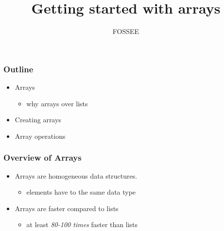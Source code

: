 \documentclass[presentation]{beamer}
\title{Getting started with arrays}
\author{FOSSEE}
\date{}
\begin{document}
\maketitle









\begin{frame}
\frametitle{Outline}
\label{sec-1}

\begin{itemize}
\item Arrays

\begin{itemize}
\item why arrays over lists
\end{itemize}

\item Creating arrays
\item Array operations
\end{itemize}
\end{frame}
\begin{frame}
\frametitle{Overview of Arrays}
\label{sec-2}

\begin{itemize}
\item Arrays are homogeneous data structures.

\begin{itemize}
\item elements have to the same data type
\end{itemize}

\item Arrays are faster compared to lists

\begin{itemize}
\item at least \emph{80-100 times} faster than lists
\end{itemize}

\end{itemize}
\end{frame}
\end{document}
